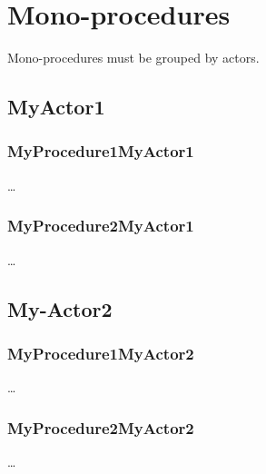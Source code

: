 \break



\section{Mono-procedures}
Mono-procedures must be grouped by actors.


\subsection{MyActor1}

\subsubsection{MyProcedure1MyActor1}
\ldots

\subsubsection{MyProcedure2MyActor1}
\ldots


\subsection{My-Actor2}

\subsubsection{MyProcedure1MyActor2}
\ldots

\subsubsection{MyProcedure2MyActor2}
\ldots














